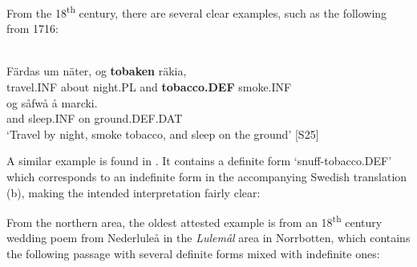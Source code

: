 From the 18\textsuperscript{th} century, there are several clear examples, such as the following from 1716:

\ea \label{} 
\\
\gll Färdas  um  näter,  og  \textbf{tobaken} räkia,\\
travel.INF  about  night.PL  and  \textbf{tobacco.DEF} smoke.INF\\
\gll og  såfwå  å  marcki.\\
and  sleep.INF  on   ground.DEF.DAT\\
\glt ‘Travel by night, smoke tobacco, and sleep on the ground’ [S25] 

\z

A similar example is found in \citet{Näsman1733}. It contains a definite form  ‘snuff-tobacco.DEF’ which corresponds to an indefinite form in the accompanying Swedish translation (b), making the intended interpretation fairly clear:

\ea\label{}
	\z	
\z

From the northern area, the oldest attested example is from an 18\textsuperscript{th} century wedding poem from Nederluleå in the \textit{Lulemål} area in Norrbotten, which contains the following passage with several definite forms mixed with indefinite ones:

